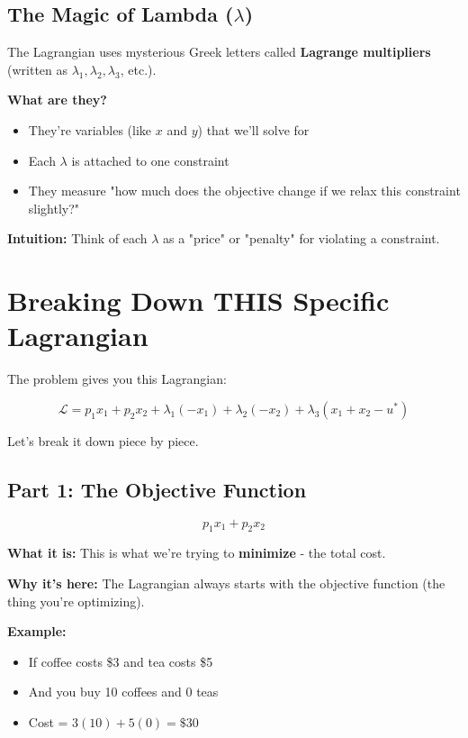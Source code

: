 \documentclass[11pt]{article}
\begin{document}
\subsection{The Magic of Lambda ($\lambda$)}

The Lagrangian uses mysterious Greek letters called \textbf{Lagrange multipliers} (written as $\lambda_1, \lambda_2, \lambda_3$, etc.).

\textbf{What are they?}
\begin{itemize}
\item They're variables (like $x$ and $y$) that we'll solve for
\item Each $\lambda$ is attached to one constraint
\item They measure "how much does the objective change if we relax this constraint slightly?"
\end{itemize}

\textbf{Intuition:} Think of each $\lambda$ as a "price" or "penalty" for violating a constraint.

\section{Breaking Down THIS Specific Lagrangian}

The problem gives you this Lagrangian:

\begin{equation}
\mathcal{L} = p_1 x_1 + p_2 x_2 + \lambda_1(-x_1) + \lambda_2(-x_2) + \lambda_3(x_1 + x_2 - u^*)
\end{equation}

Let's break it down piece by piece.

\subsection{Part 1: The Objective Function}

\begin{equation}
\boxed{p_1 x_1 + p_2 x_2}
\end{equation}

\textbf{What it is:} This is what we're trying to \textbf{minimize} - the total cost.

\textbf{Why it's here:} The Lagrangian always starts with the objective function (the thing you're optimizing).

\textbf{Example:}
\begin{itemize}
\item If coffee costs \$3 and tea costs \$5
\item And you buy 10 coffees and 0 teas
\item Cost = $3(10) + 5(0) = \$30$
\end{itemize}
\end{document}
